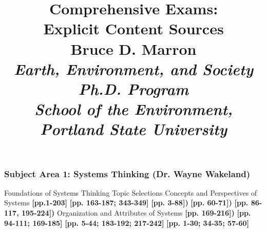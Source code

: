 \documentclass[12pt]{article}
\title{
\vspace{5mm}
\textmd{\textbf{Comprehensive Exams: \\
Explicit Content Sources}}\\
\normalsize {Bruce D. Marron}\\
\textit{\normalsize {Earth, Environment, and Society Ph.D. Program\\
School of the Environment, Portland State University}}\\
}
\date{}
\begin{document}
\maketitle
\thispagestyle{empty}
\clearpage\maketitle

\subsubsection{Subject Area 1: Systems Thinking (Dr. Wayne Wakeland)}
\begin{outline}[enumerate]
\1 Foundations of Systems Thinking
\2 Topic Selections
\3 Concepts and Perspectives of Systems
\4 \cite{meadows_thinking_2008} \textbf{[pp.1-203]}
\4 \cite{senge_fifth_2006} \textbf{[pp. 163-187; 343-349]}
\4 \cite{lendaris_systemness_1986}
\4 \cite{bertalanffy_general_1984} \textbf{[pp. 3-88])}
\4 \cite{zwick_elements_2014} \textbf{[pp. 60-71])}
\4 \cite{ashby_introduction_1955} \textbf{[pp. 86-117, 195-224])}
\3 Organization and Attributes of Systems
\4 \cite{simon_sciences_1996} \textbf{[pp. 169-216])}
\4 \cite{barabasi_scale-free_2003}
\4 \cite{barabasi_scale-free_2009}
\4 \cite{crutchfield_chaos_1986}
\4 \cite{mitchell_complexity:_2009} \textbf{[pp. 94-111; 169-185]}
\4 \cite{nicolis_exploring_1989} \textbf{[pp. 5-44; 183-192; 217-242]}
\4 \cite{cover_elements_2006} \textbf{[pp. 1-30; 34-35; 57-60]}
\end{outline}



\newpage
\end{document}
